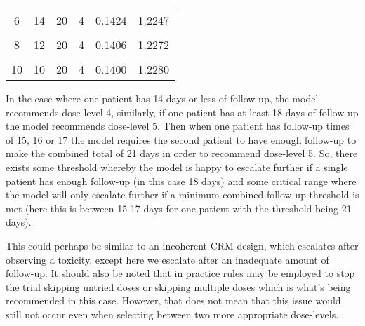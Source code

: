 \begin{table}[H]
\begin{tabular}[t]{cccccc}
		\cellcolor{gray!6}{5} & \cellcolor{gray!6}{15} & \cellcolor{gray!6}{20} & \cellcolor{gray!6}{4} & \cellcolor{gray!6}{0.1437} & \cellcolor{gray!6}{1.2228}\\
		6 & 14 & 20 & 4 & 0.1424 & 1.2247\\
		\cellcolor{gray!6}{7} & \cellcolor{gray!6}{13} & \cellcolor{gray!6}{20} & \cellcolor{gray!6}{4} & \cellcolor{gray!6}{0.1414} & \cellcolor{gray!6}{1.2261}\\
		8 & 12 & 20 & 4 & 0.1406 & 1.2272\\
		\cellcolor{gray!6}{9} & \cellcolor{gray!6}{11} & \cellcolor{gray!6}{20} & \cellcolor{gray!6}{4} & \cellcolor{gray!6}{0.1402} & \cellcolor{gray!6}{1.2278}\\
		10 & 10 & 20 & 4 & 0.1400 & 1.2280\\
		\bottomrule
	\end{tabular}
\end{table}

In the case where one patient has 14 days or less of follow-up, the model recommends dose-level 4, similarly, if one patient has at least 18 days of follow up the model recommends dose-level 5. Then when one patient has follow-up times of 15, 16 or 17 the model requires the second patient to have enough follow-up to make the combined total of 21 days in order to recommend dose-level 5. So, there exists some threshold whereby the model is happy to escalate further if a single patient has enough follow-up (in this case 18 days) and some critical range where the model will only escalate further if a minimum combined follow-up threshold is met (here this is between 15-17 days for one patient with the threshold being 21 days).

This could perhaps be similar to an incoherent CRM design, which escalates after observing a toxicity, except here we escalate after an inadequate amount of follow-up. It should also be noted that in practice rules may be employed to stop the trial skipping untried doses or skipping multiple doses which is what's being recommended in this case. However, that does not mean that this issue would still not occur even when selecting between two more appropriate dose-levels. 

